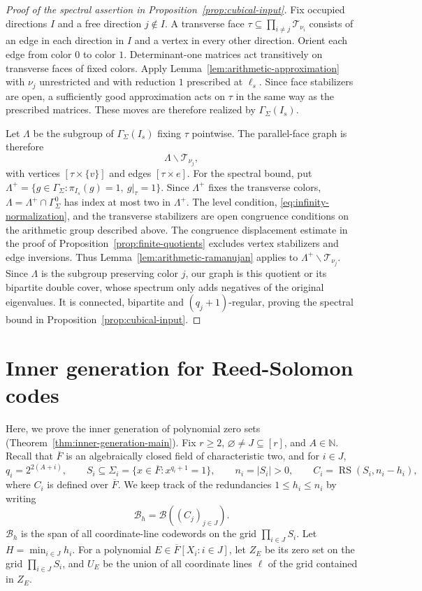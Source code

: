 \documentclass[11pt,letterpaper]{article}
\renewcommand{\le}{\leqslant}
\renewcommand{\ge}{\geqslant}
\theoremstyle{definition}
\theoremstyle{remark}
\newcommand{\cB}{\mathcal B}
\newcommand{\RS}{\operatorname{RS}}
\begin{document}
\begin{proof}[Proof of the spectral assertion in
Proposition~\ref{prop:cubical-input}]
Fix occupied directions $I$ and a free direction $j\notin I$.
A transverse face $\tau\subseteq\prod_{i\ne j}\mathcal T_{\nu_i}$ consists of
an edge in each direction in $I$ and a vertex in every other
direction. Orient each edge from color $0$ to color $1$.
Determinant-one matrices act transitively on transverse faces of fixed
colors. Apply Lemma~\ref{lem:arithmetic-approximation} with $\nu_j$
unrestricted and with reduction $1$ prescribed at $\ell_s$. Since face
stabilizers are open, a sufficiently good approximation acts on $\tau$
in the same way as the prescribed matrices. These moves are therefore
realized by $\Gamma_\Sigma(I_s)$.

Let $\Lambda$ be the subgroup of $\Gamma_\Sigma(I_s)$ fixing $\tau$ pointwise.
The parallel-face graph is therefore
\[
 \Lambda\backslash\mathcal T_{\nu_j},
\]
with vertices $[\tau\times\{v\}]$ and edges $[\tau\times e]$.
For the spectral bound, put
$\Lambda^+=\{g\in\Gamma_\Sigma:\pi_{I_s}(g)=1,\ g|_\tau=1\}$.
Since $\Lambda^+$ fixes the transverse colors,
$\Lambda=\Lambda^+\cap\Gamma_\Sigma^0$ has index at most two in $\Lambda^+$.
The level condition, \eqref{eq:infinity-normalization}, and the
transverse stabilizers are open congruence conditions on the arithmetic
group described above. The congruence displacement estimate in the proof of
Proposition~\ref{prop:finite-quotients} excludes vertex stabilizers
and edge inversions. Thus Lemma~\ref{lem:arithmetic-ramanujan}
applies to $\Lambda^+\backslash\mathcal T_{\nu_j}$.
Since $\Lambda$ is the subgroup preserving color $j$, our graph
is this quotient or its bipartite double cover, whose
spectrum only adds negatives of the original eigenvalues.
It is connected, bipartite and $(q_j+1)$-regular, proving
the spectral bound in Proposition~\ref{prop:cubical-input}.
\end{proof}

\section{Inner generation for Reed-Solomon codes}
\label{arb:sec-local}\label{sec:algebra}

Here, we prove the inner generation of polynomial zero sets (Theorem~\ref{thm:inner-generation-main}). Fix $r\ge2$, $\varnothing \neq J \subseteq [r]$, and $A \in \mathbb N$. Recall that $\overline{F}$ is an algebraically closed field of characteristic two, and for $i\in J$,
\[
 q_i=2^{2(A+i)},\qquad
 S_i \subseteq  \Sigma_i=\{x\in\overline F:x^{q_i+1}=1\},\qquad n_i = |S_i| >0, \qquad C_i=\RS(S_i,n_i-h_i),
\]
where $C_i$ is defined over $\overline F$. We keep track of the redundancies $1\le h_i\le n_i$ by writing
\[
\cB_h = \cB((C_j)_{j \in J}).
\]
$\cB_h$ is the span of all coordinate-line codewords on the grid $\prod_{i \in J} S_i$. Let $H=\min_{i \in J} h_i$.
For a polynomial $E \in \overline F[X_i : i\in J]$, let $Z_E$ be its zero set on the grid $\prod_{i \in J} S_i$, and
$U_E$ be the union of all coordinate lines $\ell$ of the grid contained in $Z_E$.
\end{document}
